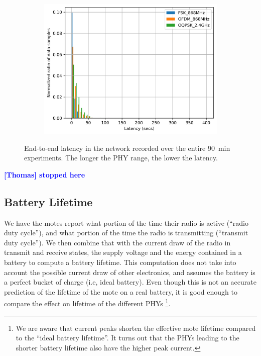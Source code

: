 \documentclass[sensors,article,submit,moreauthors,pdftex]{Definitions/mdpi}
\newcommand{\thomas}[1]     {\textbf{\textcolor{blue}{[Thomas] #1}}}
\begin{document}
\begin{figure}
\begin{subfigure}{0.49\columnwidth}
    	\includegraphics[width=1.00\columnwidth]{latency_pdf}
    	\label{fig:latency_pdf}
	\end{subfigure}
	\caption{
	    End-to-end latency in the network recorded over the entire 90~min experiments.
	    The longer the PHY range, the lower the latency.
	}
	\label{fig:latency_all}
\end{figure}

\thomas{stopped here}

\subsection{Battery Lifetime}
\label{sec:res_lifetime}

We have the motes report what portion of the time their radio is active (``radio duty cycle''), and what portion of the time the radio is transmitting (``transmit duty cycle'').
We then combine that with the current draw of the radio in transmit and receive states, the supply voltage and the energy contained in a battery to compute a battery lifetime.
This computation does not take into account the possible current draw of other electronics, and assumes the battery is a perfect bucket of charge (i.e, ideal battery).
Even though this is not an accurate prediction of the lifetime of the mote on a real battery, it is good enough to compare the effect on lifetime of the different PHYs \footnote{We are aware that current peaks shorten the effective mote lifetime compared to the ``ideal battery lifetime''.
It turns out that the PHYs leading to the shorter battery lifetime also have the higher peak current.}.
\end{document}
